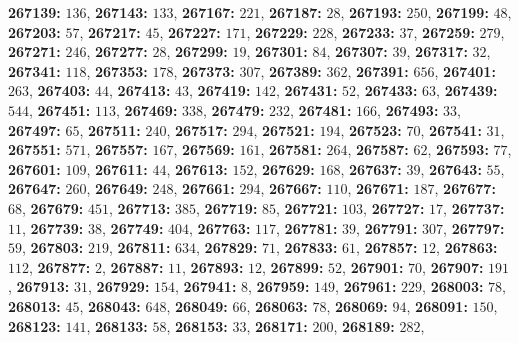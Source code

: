 \textsf{\bfseries 267139:} $136$, \textsf{\bfseries 267143:} $133$, \textsf{\bfseries 267167:} $221$, \textsf{\bfseries 267187:} $28$, \textsf{\bfseries 267193:} $250$, \textsf{\bfseries 267199:} $48$, \textsf{\bfseries 267203:} $57$, \textsf{\bfseries 267217:} $45$, \textsf{\bfseries 267227:} $171$, \textsf{\bfseries 267229:} $228$, \textsf{\bfseries 267233:} $37$, \textsf{\bfseries 267259:} $279$, \textsf{\bfseries 267271:} $246$, \textsf{\bfseries 267277:} $28$, \textsf{\bfseries 267299:} $19$, \textsf{\bfseries 267301:} $84$, \textsf{\bfseries 267307:} $39$, \textsf{\bfseries 267317:} $32$, \textsf{\bfseries 267341:} $118$, \textsf{\bfseries 267353:} $178$, \textsf{\bfseries 267373:} $307$, \textsf{\bfseries 267389:} $362$, \textsf{\bfseries 267391:} $656$, \textsf{\bfseries 267401:} $263$, \textsf{\bfseries 267403:} $44$, \textsf{\bfseries 267413:} $43$, \textsf{\bfseries 267419:} $142$, \textsf{\bfseries 267431:} $52$, \textsf{\bfseries 267433:} $63$, \textsf{\bfseries 267439:} $544$, \textsf{\bfseries 267451:} $113$, \textsf{\bfseries 267469:} $338$, \textsf{\bfseries 267479:} $232$, \textsf{\bfseries 267481:} $166$, \textsf{\bfseries 267493:} $33$, \textsf{\bfseries 267497:} $65$, \textsf{\bfseries 267511:} $240$, \textsf{\bfseries 267517:} $294$, \textsf{\bfseries 267521:} $194$, \textsf{\bfseries 267523:} $70$, \textsf{\bfseries 267541:} $31$, \textsf{\bfseries 267551:} $571$, \textsf{\bfseries 267557:} $167$, \textsf{\bfseries 267569:} $161$, \textsf{\bfseries 267581:} $264$, \textsf{\bfseries 267587:} $62$, \textsf{\bfseries 267593:} $77$, \textsf{\bfseries 267601:} $109$, \textsf{\bfseries 267611:} $44$, \textsf{\bfseries 267613:} $152$, \textsf{\bfseries 267629:} $168$, \textsf{\bfseries 267637:} $39$, \textsf{\bfseries 267643:} $55$, \textsf{\bfseries 267647:} $260$, \textsf{\bfseries 267649:} $248$, \textsf{\bfseries 267661:} $294$, \textsf{\bfseries 267667:} $110$, \textsf{\bfseries 267671:} $187$, \textsf{\bfseries 267677:} $68$, \textsf{\bfseries 267679:} $451$, \textsf{\bfseries 267713:} $385$, \textsf{\bfseries 267719:} $85$, \textsf{\bfseries 267721:} $103$, \textsf{\bfseries 267727:} $17$, \textsf{\bfseries 267737:} $11$, \textsf{\bfseries 267739:} $38$, \textsf{\bfseries 267749:} $404$, \textsf{\bfseries 267763:} $117$, \textsf{\bfseries 267781:} $39$, \textsf{\bfseries 267791:} $307$, \textsf{\bfseries 267797:} $59$, \textsf{\bfseries 267803:} $219$, \textsf{\bfseries 267811:} $634$, \textsf{\bfseries 267829:} $71$, \textsf{\bfseries 267833:} $61$, \textsf{\bfseries 267857:} $12$, \textsf{\bfseries 267863:} $112$, \textsf{\bfseries 267877:} $2$, \textsf{\bfseries 267887:} $11$, \textsf{\bfseries 267893:} $12$, \textsf{\bfseries 267899:} $52$, \textsf{\bfseries 267901:} $70$, \textsf{\bfseries 267907:} $191$, \textsf{\bfseries 267913:} $31$, \textsf{\bfseries 267929:} $154$, \textsf{\bfseries 267941:} $8$, \textsf{\bfseries 267959:} $149$, \textsf{\bfseries 267961:} $229$, \textsf{\bfseries 268003:} $78$, \textsf{\bfseries 268013:} $45$, \textsf{\bfseries 268043:} $648$, \textsf{\bfseries 268049:} $66$, \textsf{\bfseries 268063:} $78$, \textsf{\bfseries 268069:} $94$, \textsf{\bfseries 268091:} $150$, \textsf{\bfseries 268123:} $141$, \textsf{\bfseries 268133:} $58$, \textsf{\bfseries 268153:} $33$, \textsf{\bfseries 268171:} $200$, \textsf{\bfseries 268189:} $282$, 
